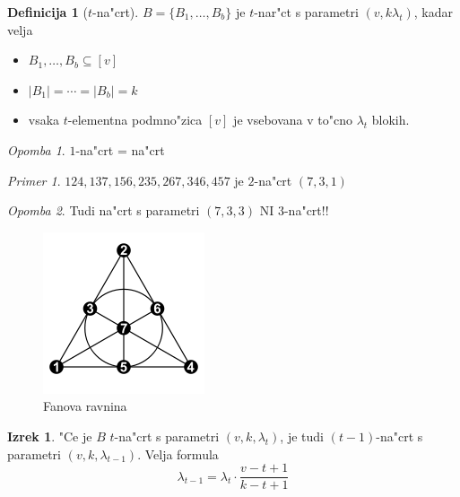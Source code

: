 \documentclass[a4paper,12pt]{article}
\theoremstyle{definition}
\newtheorem{defn}[counter]{Definicija}
\newtheorem{theorem}[counter]{Izrek}
\theoremstyle{remark}
\newtheorem*{ex}{Primer}
\newtheorem*{rem}{Opomba}
\begin{document}
\begin{defn}[$t$-na"crt]
	$B = \{B_1, \ldots, B_b\}$ je $t$-nar"ct s parametri $(v, k \lambda_t)$, kadar velja
	\begin{itemize}
		\item $B_1, \ldots, B_b \subseteq [v]$
		\item $|B_1| = \cdots = |B_b| = k$
		\item vsaka $t$-elementna podmno"zica $[v]$ je vsebovana v to"cno $\lambda_t$ blokih.
	\end{itemize}
\end{defn}
\begin{rem}
	$1$-na"crt = na"crt
\end{rem}
\begin{ex}
	$124, 137, 156, 235, 267, 346, 457$ je $2$-na"crt $(7, 3, 1)$
\end{ex}
\begin{rem}
	Tudi na"crt s parametri $(7, 3, 3)$ NI $3$-na"crt!!
\end{rem}

\label{TODO: add explanation, kaj je point?}
\begin{figure}[h!]
	\centering
	\includegraphics[scale=0.5]{fano_plane}
	\caption{Fanova ravnina}
\end{figure}

\begin{theorem}
	"Ce je $B$ $t$-na"crt s parametri $(v, k, \lambda_t)$, je tudi $(t-1)$-na"crt s parametri $(v, k, \lambda_{t-1})$. Velja formula
	\[\lambda_{t-1} = \lambda_t \cdot \frac{v - t + 1}{k - t + 1}\]
\end{theorem}
\end{document}
